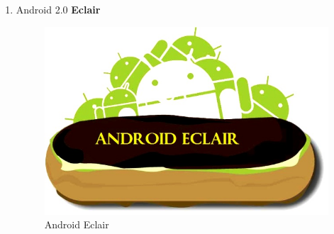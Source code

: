 \begin{enumerate}
\item Android 2.0 \textbf{Eclair}
\begin{figure}[!htbp]
    \centering
    \includegraphics[scale=0.3]{pictures/android-eclair.jpg}
    \caption{Android Eclair}
    \label{}
\end{figure}


\end{enumerate}
